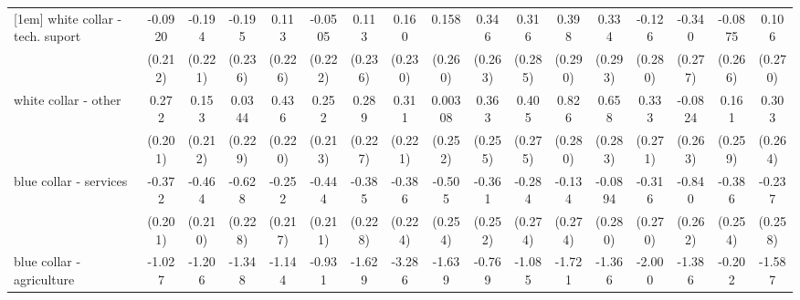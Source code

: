 {\begin{tabular}{l*{16}{c}}
[1em]
white collar - tech. suport&     -0.0920         &      -0.194         &      -0.195         &       0.113         &     -0.0505         &       0.113         &       0.160         &       0.158         &       0.346         &       0.316         &       0.398         &       0.334         &      -0.126         &      -0.340         &     -0.0875         &       0.106         \\
                    &     (0.212)         &     (0.221)         &     (0.236)         &     (0.226)         &     (0.222)         &     (0.236)         &     (0.230)         &     (0.260)         &     (0.263)         &     (0.285)         &     (0.290)         &     (0.293)         &     (0.280)         &     (0.277)         &     (0.266)         &     (0.270)         \\
[1em]
white collar - other&       0.272         &       0.153         &      0.0344         &       0.436\sym{*}  &       0.252         &       0.289         &       0.311         &     0.00308         &       0.363         &       0.405         &       0.826\sym{**} &       0.658\sym{*}  &       0.333         &     -0.0824         &       0.161         &       0.303         \\
                    &     (0.201)         &     (0.212)         &     (0.229)         &     (0.220)         &     (0.213)         &     (0.227)         &     (0.221)         &     (0.252)         &     (0.255)         &     (0.275)         &     (0.280)         &     (0.283)         &     (0.271)         &     (0.263)         &     (0.259)         &     (0.264)         \\
[1em]
blue collar - services&      -0.372         &      -0.464\sym{*}  &      -0.628\sym{**} &      -0.252         &      -0.444\sym{*}  &      -0.385         &      -0.386         &      -0.505\sym{*}  &      -0.361         &      -0.284         &      -0.134         &     -0.0894         &      -0.316         &      -0.840\sym{**} &      -0.386         &      -0.237         \\
                    &     (0.201)         &     (0.210)         &     (0.228)         &     (0.217)         &     (0.211)         &     (0.228)         &     (0.224)         &     (0.254)         &     (0.252)         &     (0.274)         &     (0.274)         &     (0.280)         &     (0.270)         &     (0.262)         &     (0.254)         &     (0.258)         \\
[1em]
blue collar - agriculture&      -1.027         &      -1.206         &      -1.348\sym{*}  &      -1.144         &      -0.931         &      -1.629\sym{*}  &      -3.286\sym{***}&      -1.639\sym{**} &      -0.769         &      -1.085         &      -1.721\sym{*}  &      -1.366         &      -2.000\sym{*}  &      -1.386\sym{*}  &      -0.202         &      -1.587\sym{**} \\

\end{tabular}}
